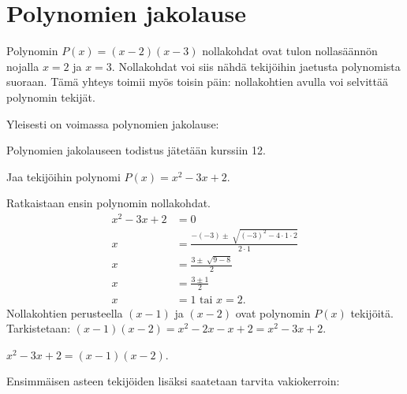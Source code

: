 \section{Polynomien jakolause}


Polynomin $P(x)=(x-2)(x-3)$ nollakohdat ovat tulon nollasäännön nojalla $x=2$ ja $x=3$. Nollakohdat voi siis nähdä tekijöihin jaetusta polynomista suoraan. Tämä  yhteys toimii myös toisin päin: nollakohtien avulla voi selvittää polynomin tekijät.

Yleisesti on voimassa polynomien jakolause:


Polynomien jakolauseen todistus jätetään kurssiin 12.

\begin{esimerkki}
Jaa tekijöihin polynomi $P(x)=x^2-3x+2$.
\begin{esimratk}
Ratkaistaan ensin polynomin nollakohdat.
\begin{align*}
x^2-3x+2&=0 \\
x&=\frac{-(-3) \pm \sqrt[]{(-3)^2-4 \cdot 1 \cdot 2}}{2 \cdot 1} \\
x&=\frac{3 \pm \sqrt[]{9-8}}{2} \\
x&=\frac{3 \pm 1}{2} \\
x&=1 \textrm{ tai } x = 2.
\end{align*}
Nollakohtien perusteella $(x-1)$ ja $(x-2)$ ovat polynomin $P(x)$ tekijöitä.
Tarkistetaan:
 $(x-1)(x-2)=x^2-2x-x+2= x^2-3x+2$.
\end{esimratk}
\begin{esimvast}
$x^2-3x+2 = (x-1)(x-2)$.
\end{esimvast}
\end{esimerkki}

Ensimmäisen asteen tekijöiden lisäksi saatetaan tarvita vakiokerroin:

